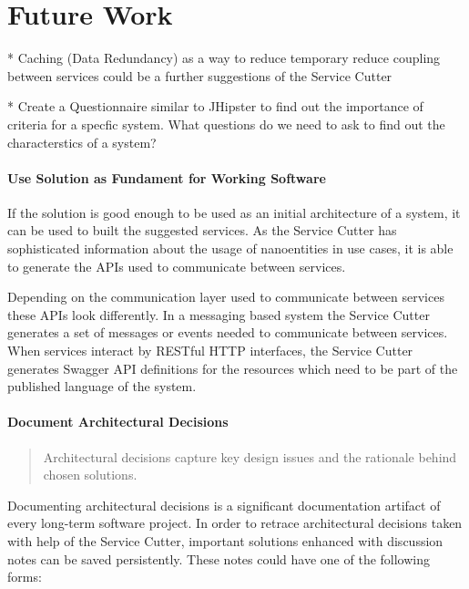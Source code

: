 \chapter{Future Work}

* Caching (Data Redundancy) as a way to reduce temporary reduce coupling between services could be a further suggestions of the Service Cutter

* Create a Questionnaire similar to JHipster to find out the importance of criteria for a specfic system. What questions do we need to ask to find out the characterstics of a system? 

\subsubsection{Use Solution as Fundament for Working Software}

If the solution is good enough to be used as an initial architecture of a system, it can be used to built the suggested services. As the Service Cutter has sophisticated information about the usage of nanoentities in use cases, it is able to generate the APIs used to communicate between services. 

Depending on the communication layer used to communicate between services these APIs look differently. In a messaging based system the Service Cutter generates a set of messages or events needed to communicate between services. When services interact by RESTful HTTP interfaces, the Service Cutter generates Swagger\cite{swagger} API definitions for the resources which need to be part of the published language\cite[p.375]{evans2003domain} of the system. 


\subsubsection{Document Architectural Decisions}

\begin{quote}
	Architectural decisions capture key design issues and the rationale behind chosen solutions.\cite{zioAD}
\end{quote}

Documenting architectural decisions is a significant documentation artifact of every long-term software project. In order to retrace architectural decisions taken with help of the Service Cutter, important solutions enhanced with discussion notes can be saved persistently. These notes could have one of the following forms:

